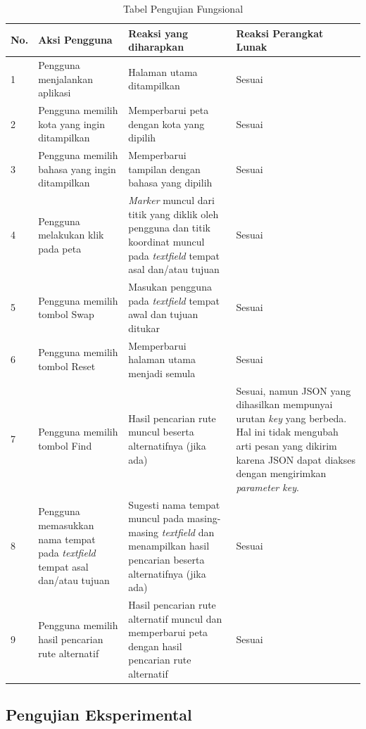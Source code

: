 \begin{table}[H]
	\centering
	\caption{Tabel Pengujian Fungsional}
		\begin{tabular}{|p{0.25cm}| p{3.5cm}| p{7cm}| p{2.5cm}|} \hline
		No.	&	Aksi Pengguna	&	Reaksi yang diharapkan	&	Reaksi Perangkat Lunak \\ \hline
		1 & Pengguna menjalankan aplikasi & Halaman utama ditampilkan & Sesuai \\ \hline
2 & Pengguna memilih kota yang ingin ditampilkan & Memperbarui peta dengan kota yang dipilih & Sesuai \\ \hline
3 & Pengguna memilih bahasa yang ingin ditampilkan & Memperbarui tampilan dengan bahasa yang dipilih & Sesuai \\ \hline
4 & Pengguna melakukan klik pada peta & \textit{Marker} muncul dari titik yang diklik oleh pengguna dan titik koordinat muncul pada \textit{textfield} tempat asal dan/atau tujuan & Sesuai \\ \hline
5 & Pengguna memilih tombol Swap & Masukan pengguna pada \textit{textfield} tempat awal dan tujuan ditukar & Sesuai \\ \hline
6 & Pengguna memilih tombol Reset & Memperbarui halaman utama menjadi semula & Sesuai \\ \hline
7 & Pengguna memilih tombol Find & Hasil pencarian rute muncul beserta alternatifnya (jika ada) & Sesuai, namun JSON yang dihasilkan mempunyai urutan \textit{key} yang berbeda. Hal ini tidak mengubah arti pesan yang dikirim karena JSON dapat diakses dengan mengirimkan \textit{parameter key}. \\ \hline
8 & Pengguna memasukkan nama tempat pada \textit{textfield} tempat asal dan/atau tujuan & Sugesti nama tempat muncul pada masing-masing \textit{textfield} dan menampilkan hasil pencarian beserta alternatifnya (jika ada) & Sesuai \\ \hline
9 & Pengguna memilih hasil pencarian rute alternatif & Hasil pencarian rute alternatif muncul dan memperbarui peta dengan hasil pencarian rute alternatif & Sesuai \\ \hline
		
		\end{tabular}
	\label{table:hasilFungsional}
\end{table}


\subsection{Pengujian Eksperimental}

